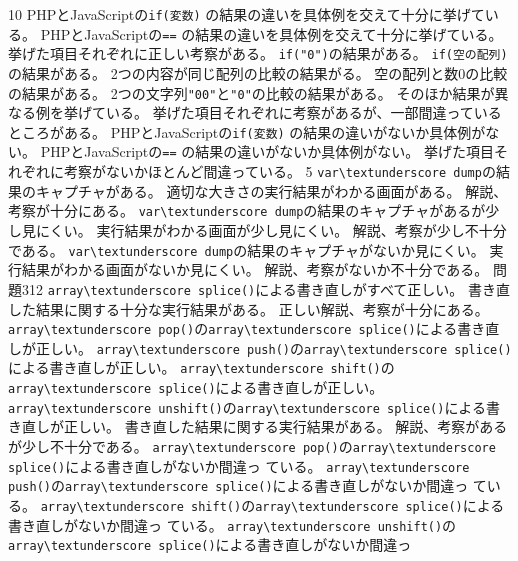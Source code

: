 {
{}{10}
 {
 {PHPとJavaScriptの\Verb+if(変数)+ の結果の違いを具体例を交えて十分に挙げている。}
 {PHPとJavaScriptの\Verb+==+ の結果の違いを具体例を交えて十分に挙げている。}
 {挙げた項目それぞれに正しい考察がある。}
 }
 {
 {\Verb+if("0")+の結果がある。}
 {\Verb+if(空の配列)+の結果がある。}
 {2つの内容が同じ配列の比較の結果がる。}
 {空の配列と数$0$の比較の結果がある。}
 {2つの文字列\Verb+"00"+と\Verb+"0"+の比較の結果がある。}
 {そのほか結果が異なる例を挙げている。}
 {挙げた項目それぞれに考察があるが、一部間違っているところがある。}
 }
 {
 {PHPとJavaScriptの\Verb+if(変数)+ の結果の違いがないか具体例がない。}
 {PHPとJavaScriptの\Verb+==+ の結果の違いがないか具体例がない。}
 {挙げた項目それぞれに考察がないかほとんど間違っている。}
 }
 {}{5}
 {
 {\Verb+var\textunderscore dump+の結果のキャプチャがある。}
 {適切な大きさの実行結果がわかる画面がある。}
 {解説、考察が十分にある。}
 }
 {
 {\Verb+var\textunderscore dump+の結果のキャプチャがあるが少し見にくい。}
 {実行結果がわかる画面が少し見にくい。}
 {解説、考察が少し不十分である。}
 }
 {
 {\Verb+var\textunderscore dump+の結果のキャプチャがないか見にくい。}
 {実行結果がわかる画面がないか見にくい。}
 {解説、考察がないか不十分である。}
 }
 {問題3}{12}
 {
 {\Verb+array\textunderscore splice()+による書き直しがすべて正しい。}
 {書き直した結果に関する十分な実行結果がある。}
 {正しい解説、考察が十分にある。}
 }
 {
 {\Verb+array\textunderscore pop()+の\newline\Verb+array\textunderscore splice()+による書き直しが正しい。}
 {\Verb+array\textunderscore push()+の\newline\Verb+array\textunderscore splice()+による書き直しが正しい。}
 {\Verb+array\textunderscore shift()+の\newline\Verb+array\textunderscore splice()+による書き直しが正しい。}
 {\Verb+array\textunderscore unshift()+の\newline\Verb+array\textunderscore splice()+による書き直しが正しい。}
 {書き直した結果に関する実行結果がある。}
 {解説、考察があるが少し不十分である。}
 }
 {
 {\Verb+array\textunderscore pop()+の\newline\Verb+array\textunderscore splice()+による書き直しがないか間違っ
 ている。}
 {\Verb+array\textunderscore push()+の\newline\Verb+array\textunderscore splice()+による書き直しがないか間違っ
 ている。}
 {\Verb+array\textunderscore shift()+の\newline\Verb+array\textunderscore splice()+による書き直しがないか間違っ
 ている。}
 {\Verb+array\textunderscore unshift()+の\newline\Verb+array\textunderscore splice()+による書き直しがないか間違っ
}}}
